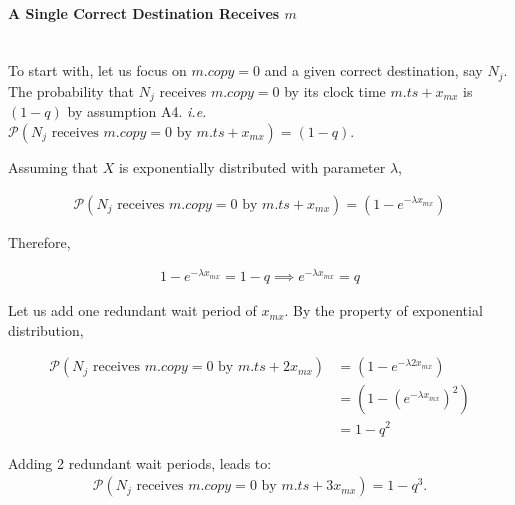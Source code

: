         \paragraph{A Single Correct Destination Receives $m$}\hfill \\   
        To start with, let us focus on $m.copy = 0$ and a given correct destination, say $N_j$.  The probability that $N_j$ receives $m.copy = 0$ by its clock time $m.ts + x_{mx}$ is $(1 - q)$ by assumption A4.  \emph{i.e.} $\mathcal{P}(N_j\text{ receives } m.copy = 0 \text{ by } m.ts + x_{mx}) = (1 - q)$.  
        
        Assuming that $X$ is exponentially distributed with parameter $\lambda$, 
        
        \begin{equation}
            \begin{aligned}
                \mathcal{P}(N_j\text{ receives } m.copy = 0 \text{ by } m.ts + x_{mx})  = \left(1 - e^{-\lambda x_{mx}}\right)
            \end{aligned}
        \end{equation}
        
        Therefore,
        
        \begin{equation}
            \label{eq:1_minus_q}
            \begin{aligned}
                1 - e^{-\lambda x_{mx}} = 1 - q \implies e^{-\lambda x_{mx}} = q
            \end{aligned}
        \end{equation}
        
        Let us add one redundant wait period of $x_{mx}$.  By the property of exponential distribution,
        
        \begin{equation}
            \begin{split}
                \mathcal{P}(N_j\text{ receives } m.copy = 0 \text{ by } m.ts + 2x_{mx})  &= \left(1 - e^{-\lambda 2 x_{mx}} \right) \\
                &= \left(1 - \left(e^{-\lambda x_{mx}} \right)^2\right) \\
                &= 1 - q^2
            \end{split}
        \end{equation}
        
        Adding 2 redundant wait periods, leads to: 
         \begin{equation}
            \begin{aligned}
                \mathcal{P}(N_j\text{ receives } m.copy = 0 \text{ by } m.ts + 3x_{mx})  = 1 - q^3.
            \end{aligned}
        \end{equation}
        
